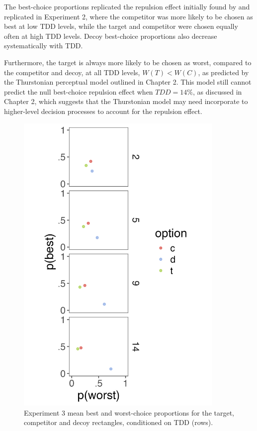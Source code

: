The best-choice proportions replicated the repulsion effect initially found by \textcite{spektorWhenGoodLooks2018b} and replicated in Experiment 2, where the competitor was more likely to be chosen as best at low TDD levels, while the target and competitor were chosen equally often at high TDD levels. Decoy best-choice proportions also decrease systematically with TDD. 

Furthermore, the target is always more likely to be chosen as worst, compared to the competitor and decoy, at all TDD levels, $W(T)<W(C)$, as predicted by the Thurstonian perceptual model outlined in Chapter 2. This model still cannot predict the null best-choice repulsion effect when $TDD=14\%$, as discussed in Chapter 2, which suggests that the Thurstonian model may need incorporate to higher-level decision processes to account for the repulsion effect.

\begin{figure}
   \includegraphics[width=100mm]{figures/crit_mean_props_by_dist.jpeg}
   \caption{Experiment 3 mean best and worst-choice proportions for the target, competitor and decoy rectangles, conditioned on TDD (rows).}
   \label{fig:bw_mean_choice_collapsed}
\end{figure}

